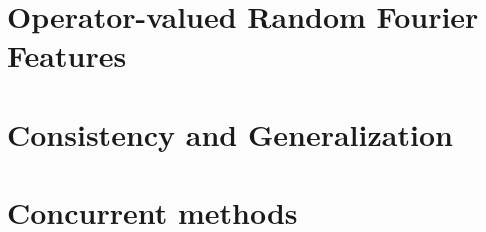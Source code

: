 \chapter{Operator-valued Random Fourier Features}
\label{ch:operator-valued_random_fourier_features}


\chapter{Consistency and Generalization} %
\label{ch:concistency_and_generalization}


\chapter{Concurrent methods} %
\label{ch:concurrent_methods}

